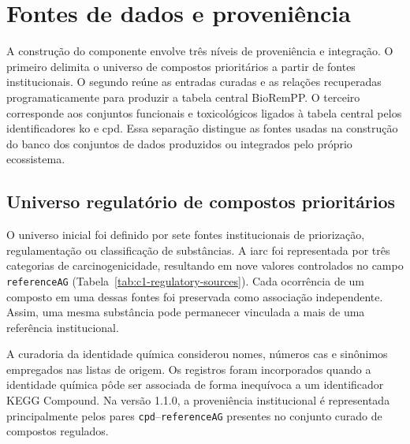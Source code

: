 \section{Fontes de dados e proveniência}
\label{sec:c1-fontes}

A construção do componente envolve três níveis de proveniência e integração. O primeiro delimita o universo de compostos prioritários a partir de fontes institucionais. O segundo reúne as entradas curadas e as relações recuperadas programaticamente para produzir a tabela central BioRemPP. O terceiro corresponde aos conjuntos funcionais e toxicológicos ligados à tabela central pelos identificadores \gls{ko} e \gls{cpd}. Essa separação distingue as fontes usadas na construção do banco dos conjuntos de dados produzidos ou integrados pelo próprio ecossistema.

\subsection{Universo regulatório de compostos prioritários}

O universo inicial foi definido por sete fontes institucionais de priorização, regulamentação ou classificação de substâncias. A \gls{iarc} foi representada por três categorias de carcinogenicidade, resultando em nove valores controlados no campo \texttt{referenceAG} (Tabela~\ref{tab:c1-regulatory-sources}). Cada ocorrência de um composto em uma dessas fontes foi preservada como associação independente. Assim, uma mesma substância pode permanecer vinculada a mais de uma referência institucional.

A curadoria da identidade química considerou nomes, números \gls{cas} e sinônimos empregados nas listas de origem. Os registros foram incorporados quando a identidade química pôde ser associada de forma inequívoca a um identificador KEGG Compound. Na versão 1.1.0, a proveniência institucional é representada principalmente pelos pares \texttt{cpd}--\texttt{referenceAG} presentes no conjunto curado de compostos regulados.

